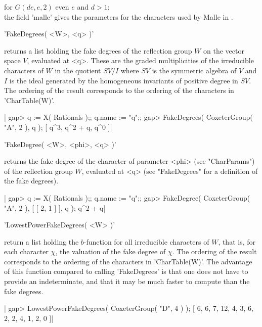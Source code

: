 for  $G(de,e,2)$  even  $e$  and  $d>1$:\\  the  field  'malle'  gives  the
  parameters for the characters used by Malle in \cite{Mal96}.


'FakeDegrees( <W>, <q> )'

returns  a list holding the fake degrees of the reflection group $W$ on the
vector  space $V$, evaluated at <q>. These are the graded multiplicities of
the  irreducible characters of $W$ in the quotient $SV/I$ where $SV$ is the
symmetric  algebra of $V$ and $I$ is the ideal generated by the homogeneous
invariants  of  positive  degree  in  $SV$.  The  ordering  of  the  result
corresponds to the ordering of the characters in 'CharTable(W)'.

|    gap> q := X( Rationals );; q.name := "q";;
    gap> FakeDegrees( CoxeterGroup( "A", 2 ), q );
    [ q^3, q^2 + q, q^0 ]|


'FakeDegree( <W>, <phi>, <q> )'

returns  the  fake degree  of  the  character  of parameter  <phi>  (see
"CharParams")  of  the  reflection  group $W$,  evaluated  at  <q>  (see
"FakeDegrees" for a definition of the fake degrees).

|    gap> q := X( Rationals );; q.name := "q";;
    gap> FakeDegree( CoxeterGroup( "A", 2 ), [ [ 2, 1 ] ], q );
    q^2 + q|


'LowestPowerFakeDegrees( <W> )'

return a list holding the $b$-function for all irreducible characters of
$W$,  that is,  for each  character $\chi$,  the valuation  of the  fake
degree of $\chi$. The ordering of the result corresponds to the ordering
of  the characters  in 'CharTable(W)'.  The advantage  of this  function
compared to calling  'FakeDegrees' is that one does not  have to provide
an indeterminate,  and that it  may be much  faster to compute  than the
fake degrees.

|    gap> LowestPowerFakeDegrees( CoxeterGroup( "D", 4 ) );
    [ 6, 6, 7, 12, 4, 3, 6, 2, 2, 4, 1, 2, 0 ]|

